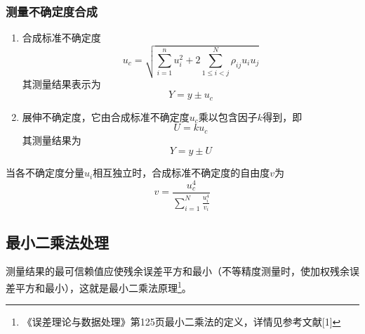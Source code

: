 \subsubsection{测量不确定度合成}
\begin{enumerate}
	\item 合成标准不确定度\[ u_c=\sqrt{\sum_{i=1}^{n}u_i^2+2\sum_{1\le i<j}^{N}\rho_{ij}u_iu_j} \]
	其测量结果表示为\[ Y=y\pm u_c \]
	\item 展伸不确定度，它由合成标准不确定度$ u_c $乘以包含因子$ k $得到，即\[ U=ku_c \]
	其测量结果为\[ Y=y\pm U \]
\end{enumerate}
当各不确定度分量$ u_i $相互独立时，合成标准不确定度的自由度$ v $为\[ v=\frac{u_c^4}{\sum\limits_{i=1}^{N}\frac{u_i^4}{v_i}} \]
\subsection{最小二乘法处理}
测量结果的最可信赖值应使残余误差平方和最小（不等精度测量时，使加权残余误差平方和最小），这就是最小二乘法原理\footnote{《误差理论与数据处理》第125页最小二乘法的定义，详情见参考文献[1]}。
